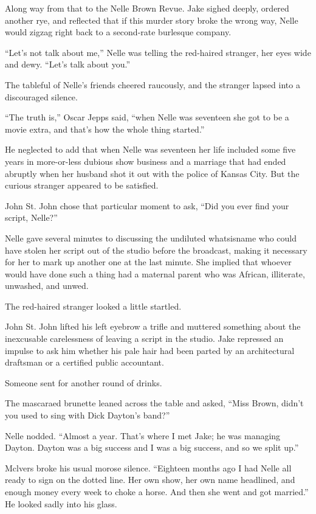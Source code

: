 \documentclass{novel}
\begin{document}
Along way from that to the Nelle Brown Revue. Jake sighed deeply, ordered another rye, and reflected that if this murder story broke the wrong way, Nelle would zigzag right back to a second-rate burlesque company.

“Let’s not talk about me,” Nelle was telling the red-haired stranger, her eyes wide and dewy. “Let’s talk about you.”

The tableful of Nelle’s friends cheered raucously, and the stranger lapsed into a discouraged silence.

“The truth is,” Oscar Jepps said, “when Nelle was seventeen she got to be a movie extra, and that’s how the whole thing started.”

He neglected to add that when Nelle was seventeen her life included some five years in more-or-less dubious show business and a marriage that had ended abruptly when her husband shot it out with the police of Kansas City. But the curious stranger appeared to be satisfied.

John St. John chose that particular moment to ask, “Did you ever find your script, Nelle?”

Nelle gave several minutes to discussing the undiluted whatsisname who could have stolen her script out of the studio before the broadcast, making it necessary for her to mark up another one at the last minute. She implied that whoever would have done such a thing had a maternal parent who was African, illiterate, unwashed, and unwed.

The red-haired stranger looked a little startled.

John St. John lifted his left eyebrow a trifle and muttered something about the inexcusable carelessness of leaving a script in the studio. Jake repressed an impulse to ask him whether his pale hair had been parted by an architectural draftsman or a certified public accountant.

Someone sent for another round of drinks.

The mascaraed brunette leaned across the table and asked, “Miss Brown, didn’t you used to sing with Dick Dayton’s band?”

Nelle nodded. “Almost a year. That’s where I met Jake; he was managing Dayton. Dayton was a big success and I was a big success, and so we split up.”

Mclvers broke his usual morose silence. “Eighteen months ago I had Nelle all ready to sign on the dotted line. Her own show, her own name headlined, and enough money every week to choke a horse. And then she went and got married.” He looked sadly into his glass.
\end{document}
